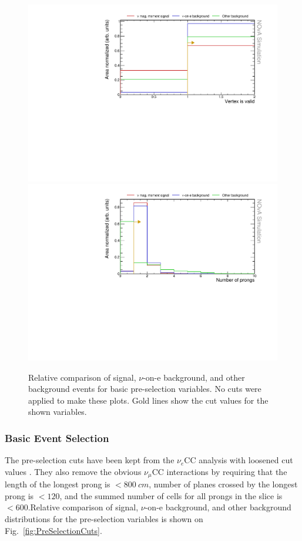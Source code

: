\begin{figure}[hbtp]
\centering
\includegraphics[width=.9\textwidth]{Plots/NuMMEventSelection/NoCut_vtxIsValid.pdf}
\includegraphics[width=.9\textwidth]{Plots/NuMMEventSelection/NoCut_NPng.pdf}
\caption{Relative comparison of signal, $\nu$-on-e background, and other background events for basic pre-selection variables. No cuts were applied to make these plots. Gold lines show the cut values for the shown variables.}
\label{fig:BasicPreSelectionCuts}
\end{figure}

\subsubsection*{Basic Event Selection}

The pre-selection cuts have been kept from the $\nu_e$\gls{CC} analysis with loosened cut values .
They also remove the obvious $\nu_\mu$CC interactions by requiring that the length of the longest prong is $<800\ \unit{cm}$, number of planes crossed by the longest prong is $<120$, and the summed number of cells for all prongs in the slice is $<600$.Relative comparison of signal, $\nu$-on-e background, and other background distributions for the pre-selection variables is shown on Fig.~\ref{fig:PreSelectionCuts}.

